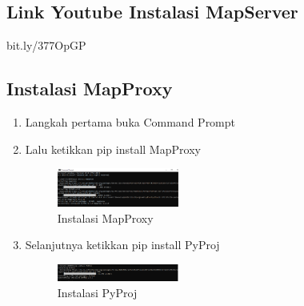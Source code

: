 \subsection{Link Youtube Instalasi MapServer}
bit.ly/377OpGP 
\subsection{Instalasi MapProxy}
\begin{enumerate}
  \item Langkah pertama buka Command Prompt
  \item Lalu ketikkan pip install MapProxy
  \hfill\break
  \begin{figure}[H]
  \includegraphics[width=4cm]{figures/tugas4/1174073/13.png}
  \centering
  \caption{Instalasi MapProxy}
  \end{figure}
  
  \item Selanjutnya ketikkan pip install PyProj
  \hfill\break
  \begin{figure}[H]
  \includegraphics[width=4cm]{figures/tugas4/1174073/14.png}
  \centering
  \caption{Instalasi PyProj}
  \end{figure}
\end{enumerate}

